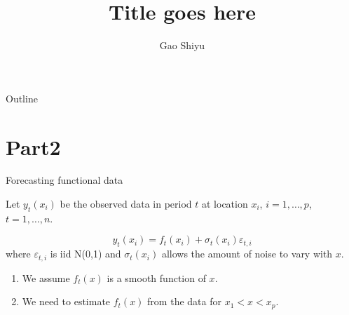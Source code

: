 \documentclass[14pt,xcolor=dvipsnames]{beamer}
\title{Title goes here}
\author{Gao Shiyu}
\begin{document}
\begin{CJK}{UTF8}{gbsn}  %

  \begin{frame}
    \titlepage
  \end{frame}

  \begin{frame}{Outline}
    \tableofcontents
  \end{frame}


  

  \section{Part2}  %

  \begin{frame}{Forecasting functional data}

    Let $y_t(x_i)$ be the observed data in period $t$ at location $x_i$,
    $i=1,\dots,p$, $t=1,\dots,n$.
    \pause

    \begin{block}{}
      \[
      y_t(x_i) = f_t(x_i) + \sigma_t(x_i)\varepsilon_{t,i}
      \]
      where $\varepsilon_{t,i}$ is iid N(0,1) and $\sigma_t(x_i)$ allows the
      amount of noise to vary with $x$.
    \end{block}
    \pause

    \begin{enumerate}[<+-| alert@+>]
      \item We assume $f_t(x)$ is a smooth function of $x$.
      \item We need to estimate $f_t(x)$ from the data for $x_1 < x < x_p$.
    \end{enumerate}
  \end{frame}

\end{CJK}  %
\end{document}
